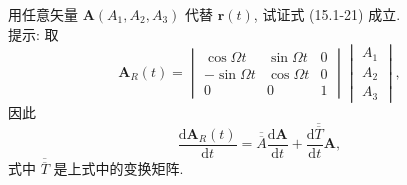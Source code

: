\documentclass[twoside]{note}
\begin{document}
\begin{exe}
    用任意矢量 $\bm{A}(A_1,A_2,A_3)$ 代替 $\bm{r}(t)$, 试证式 (15.1-21) 成立.\\
    提示: 取
    \[
        \bm{A}_{R}(t)=\begin{vmatrix}
            \cos\Omega t&\sin\Omega t&0\\
            -\sin\Omega t&\cos\Omega t&0\\
            0&0&1
        \end{vmatrix}\begin{vmatrix}
            A_1\\
            A_2\\
            A_3
        \end{vmatrix},
    \]
    因此
    \[
        \frac{\mathrm{d}\bm{A}_R(t)}{\mathrm{d}t}=\overline{\overline{A}}\frac{\mathrm{d}\bm{A}}{\mathrm{d}t}+\frac{\mathrm{d}\overline{\overline{T}}}{\mathrm{d}t}\bm{A},
    \]
    式中 $\overline{\overline{T}}$ 是上式中的变换矩阵.
\end{exe}
\begin{pf}
    
\end{pf}
\ifx\allfiles\undefined
\end{document}
